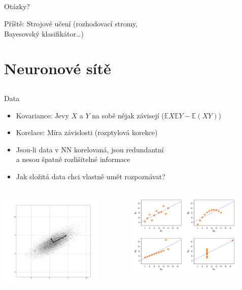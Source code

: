\documentclass{beamer}
\begin{document}
\subsection{}
\begin{frame}{Otázky?}
\begin{center}
Příště: Strojové učení (rozhodovací stromy, \\ Bayesovský klasifikátor\dots)
\end{center}
\end{frame}

\section{Neuronové sítě}

\subsection{}
\begin{frame}{Data}
\begin{itemize}
\item Kovariance: Jevy $X$ a $Y$ na sobě nějak závisejí ($\mathbb{E}X\mathbb{E}Y - \mathbb{E}(XY)$)
\item Korelace: Míra závislosti (rozptylová korekce)
\item Jsou-li data v NN korelovaná, jsou redundantní \\ a nesou špatně rozlišitelné informace
\item Jak složitá data chci vlastně umět rozpoznávat?
\end{itemize}
\begin{columns}
\begin{column}{5.5cm}
\includegraphics[width=5cm]{GaussianScatterPCA.png}
\end{column}
\begin{column}{5.5cm}
\includegraphics[width=5.5cm]{Anscombe's_quartet_3.pdf}
\end{column}
\end{columns}
\end{frame}
\end{document}
